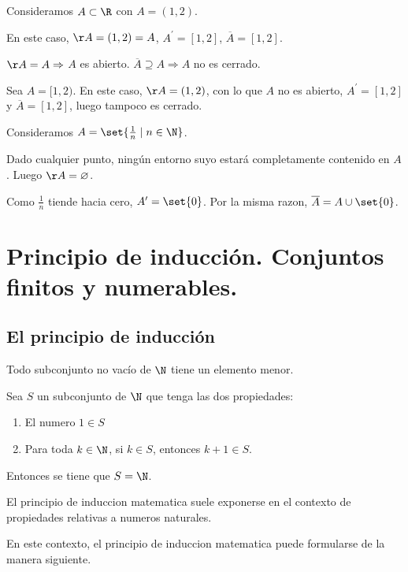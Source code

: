 \begin{example}
	Consideramos \(A \subset \R \) con \(A = (1,2 )\).

	En este caso, \(\AA = (1,2) = A \), \(A^\prime = [1,2]\), \(\overline{A} = [1,2]\).

	\(\AA = A \Rightarrow \) \(A \) es abierto. \(\overline{A} \supseteq A \Rightarrow A \) no es cerrado.


\end{example}
\begin{example}
	Sea \(A = [1,2)\). En este caso, \(\AA = (1,2)\), con lo que \(A\)  no es abierto, \(A^\prime = [1,2]\) y \(\overline{A} = [1,2]\), luego tampoco es cerrado.
\end{example}
\begin{example}
	Consideramos \(A = \set{\frac{1}{n} \mid n \in \N }\).

	Dado cualquier punto, ningún entorno suyo estará completamente contenido en \(A \). Luego \(\AA = \varnothing \).

	Como \(\frac{1}{n}\) tiende hacia cero, \(A^\prime  = \set{0}\). Por la misma razon, \(\overline{A} = A \cup \set{0}\).
\end{example}
\section{Principio de inducción. Conjuntos finitos y numerables.}
\subsection{El principio de inducción}
\begin{proposition}
	Todo subconjunto no vacío de \(\N \) tiene un elemento menor.
\end{proposition}
\begin{proposition}
	Sea \(S \) un subconjunto de \(\N \) que tenga las dos propiedades:
	\begin{enumerate}
		\item El numero \(1 \in S \)
		\item Para toda \(k \in \N \), si \(k \in S \), entonces \(k + 1 \in S \).
	\end{enumerate}
	Entonces se tiene que \(S = \N \).
\end{proposition}
El principio de induccion matematica suele exponerse en el contexto de propiedades relativas a numeros naturales.

En este contexto, el principio de induccion matematica puede formularse de la manera siguiente.

